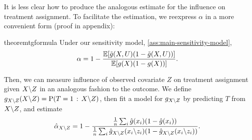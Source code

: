 \documentclass{article}
\begin{document}
It is less clear how to produce the analogous estimate for the influence on treatment assignment.
To facilitate the estimation, we reexpress $\alpha$ in a more convenient form (proof in appendix):
\begin{restatable}{theorem}{tgformula}
  Under our sensitivity model, \cref{ass:main-sensitivity-model},
\[
  \alpha=1 - \frac{\mathbb{E}[\tilde{g}(X,U)(1-\tilde{g}(X,U))]}{\mathbb{E}[g(X)(1-g(X))]}.
\]
\end{restatable}
%
%
%
%
%
%
%
%
%
%
%
%
%
%
%
%
%
%
%
%
%
%
%
%
%
%
%
%
%

Then, we can measure influence of observed covariate $Z$ on treatment
assignment given $X\backslash Z$ in an analogous fashion to the outcome.
We define $g_{X\exclude Z}(X\exclude Z)=\Pr(T=1\given X\exclude Z)$,
%
%
%
%
then fit a model for $g_{X\backslash Z}$ by predicting $T$ from $X\backslash Z$, and estimate 
\[
\hat{\alpha}_{X\backslash Z}=1 - \frac{\frac{1}{n}\sum_{i}\hat{g}(x_{i})(1-\hat{g}(x_{i}))}{\frac{1}{n}\sum_{i}\hat{g}_{X\backslash Z}(x_{i}\backslash z_{i})(1-\hat{g}_{X\backslash Z}(x_{i}\backslash z_{i}))}.
\]
\end{document}
